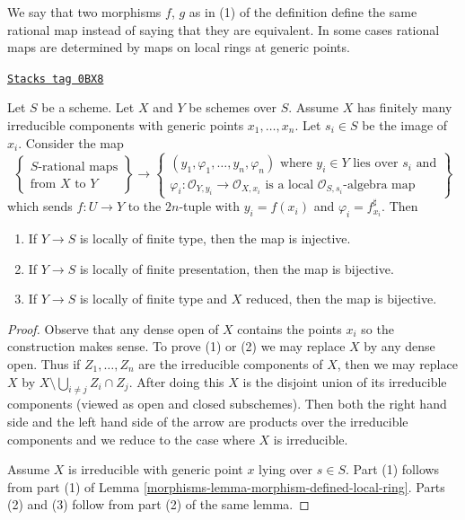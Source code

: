 We say that two morphisms $f$, $g$ as in (1) of the definition
define the same rational map instead of saying that they are equivalent.
In some cases rational maps are determined by maps on local rings
at generic points.

\begin{lemma}
\label{morphisms-lemma-rational-map-finite-presentation}
\href{https://stacks.math.columbia.edu/tag/0BX8}{\texttt{Stacks tag 0BX8}}

Let $S$ be a scheme. Let $X$ and $Y$ be schemes over $S$. Assume $X$ has
finitely many irreducible components with generic points
$x_1, \ldots, x_n$. Let $s_i \in S$ be the image of $x_i$.
Consider the map
$$
\left\{
\begin{matrix}
S\text{-rational maps} \\
\text{from }X\text{ to }Y
\end{matrix}
\right\}
\longrightarrow
\left\{
\begin{matrix}
(y_1, \varphi_1, \ldots, y_n, \varphi_n)\text{ where }
y_i \in Y\text{ lies over }s_i\text{ and}\\
\varphi_i : \mathcal{O}_{Y, y_i} \to \mathcal{O}_{X, x_i}
\text{ is a local }\mathcal{O}_{S, s_i}\text{-algebra map}
\end{matrix}
\right\}
$$
which sends $f : U \to Y$ to the $2n$-tuple with
$y_i = f(x_i)$ and $\varphi_i = f^\sharp_{x_i}$. Then
\begin{enumerate}
\item If $Y \to S$ is locally of finite type, then the map is injective.
\item If $Y \to S$ is locally of finite presentation, then the map is bijective.
\item If $Y \to S$ is locally of finite type and $X$ reduced,
then the map is bijective.
\end{enumerate}
\end{lemma}

\begin{proof}

Observe that any dense open of $X$ contains the points $x_i$
so the construction makes sense. To prove (1) or (2)
we may replace $X$ by any dense open. Thus if $Z_1, \ldots, Z_n$
are the irreducible components of $X$, then we may replace
$X$ by $X \setminus \bigcup_{i \not = j} Z_i \cap Z_j$.
After doing this $X$ is the disjoint union of its irreducible
components (viewed as open and closed subschemes). Then both the
right hand side and the left hand side of the arrow are products
over the irreducible components and we reduce to the case where
$X$ is irreducible.

\medskip\noindent
Assume $X$ is irreducible with generic point $x$ lying over $s \in S$.
Part (1) follows from part (1) of
Lemma \ref{morphisms-lemma-morphism-defined-local-ring}.
Parts (2) and (3) follow from part (2) of the same lemma.
\end{proof}

